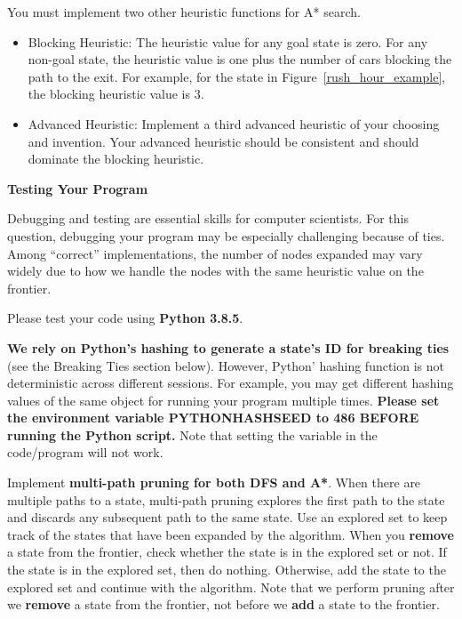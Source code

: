 \documentclass[12pt]{article}
\begin{document}
You must implement two other heuristic functions for A* search.
\begin{itemize}

  \item Blocking Heuristic: The heuristic value for any goal state is zero. For any non-goal state, the heuristic value is one plus the number of cars blocking the path to the exit. For example, for the state in Figure~\ref{rush_hour_example}, the blocking heuristic value is $3$.
  
  \item Advanced Heuristic: Implement a third advanced heuristic of your choosing and invention. Your advanced heuristic should be consistent and should dominate the blocking heuristic.
  
\end{itemize}

{\bf Testing Your Program}

Debugging and testing are essential skills for computer scientists. For this question, debugging your program may be especially challenging because of ties. Among ``correct'' implementations, the number of nodes expanded may vary widely due to how we handle the nodes with the same heuristic value on the frontier. 

Please test your code using {\bf Python 3.8.5}. 

{\bf We rely on Python's hashing to generate a state's ID for breaking ties} (see the Breaking Ties section below). However, Python' hashing function is not deterministic across different sessions. For example, you may get different hashing values of the same object for running your program multiple times. {\bf Please set the environment variable PYTHONHASHSEED to 486 BEFORE running the Python script.} Note that setting the variable in the code/program will not work.

Implement {\bf multi-path pruning for both DFS and A*}. When there are multiple paths to a state, multi-path pruning explores the first path to the state and discards any subsequent path to the same state. Use an explored set to keep track of the states that have been expanded by the algorithm. When you {\bf remove} a state from the frontier, check whether the state is in the explored set or not. If the state is in the explored set, then do nothing. Otherwise, add the state to the explored set and continue with the algorithm. Note that we perform pruning after we {\bf remove} a state from the frontier, not before we {\bf add} a state to the frontier.
\end{document}
